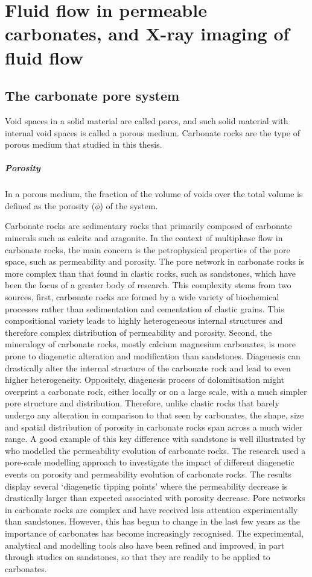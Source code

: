 \chapter{Fluid flow in permeable carbonates, and X-ray imaging of fluid flow}
\section{The carbonate pore system}
Void spaces in a solid material are called pores, and such solid material with internal void spaces is called a porous medium. Carbonate rocks are the type of porous medium that studied in this thesis.

\paragraph{Porosity}
In a porous medium, the fraction of the volume of voids over the total volume is defined as the porosity ($\phi$) of the system.

Carbonate rocks are sedimentary rocks that primarily composed of carbonate minerals such as calcite and aragonite. In the context of multiphase flow in carbonate rocks, the main concern is the petrophysical properties of the pore space, such as permeability and porosity. The pore network in carbonate rocks is more complex than that found in clastic rocks, such as sandstones, which have been the focus of a greater body of research. This complexity stems from two sources, first, carbonate rocks are formed by a wide variety of biochemical processes rather than sedimentation and cementation of clastic grains. This compositional variety leads to highly heterogeneous internal structures and therefore complex distribution of permeability and porosity. Second, the mineralogy of carbonate rocks, mostly calcium magnesium carbonates, is more prone to diagenetic alteration and modification than sandstones. Diagenesis can drastically alter the internal structure of the carbonate rock and lead to even higher heterogeneity. Oppositely, diagenesis process of dolomitisation might overprint a carbonate rock, either locally or on a large scale, with a much simpler pore structure and distribution. Therefore, unlike clastic rocks that barely undergo any alteration in comparison to that seen by carbonates, the shape, size and spatial distribution of porosity in carbonate rocks span across a much wider range. A good example of this key difference with sandstone is well illustrated by \citet{van2013modelling} who modelled the permeability evolution of carbonate rocks. The research used a pore-scale modelling approach to investigate the impact of different diagenetic events on porosity and permeability evolution of carbonate rocks. The results display several ‘diagenetic tipping points’ where the permeability decrease is drastically larger than expected associated with porosity decrease. Pore networks in carbonate rocks are complex and have received less attention experimentally than sandstones. However, this has begun to change in the last few years as the importance of carbonates has become increasingly recognised. The experimental, analytical and modelling tools also have been refined and improved, in part through studies on sandstones, so that they are readily to be applied to carbonates.

